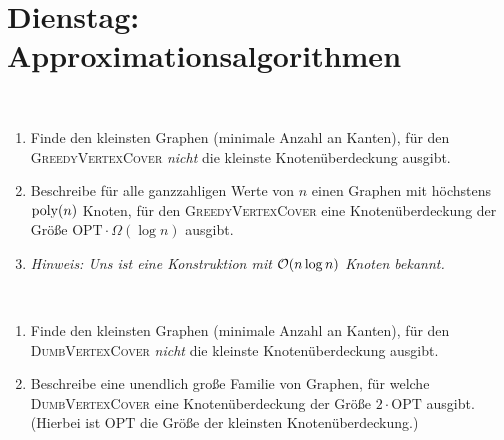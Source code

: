 \documentclass{uebung_cs}
\begin{document}
\section*{Dienstag: Approximationsalgorithmen}

\begin{exercise}\
	\begin{enumerate}
		\item\easy Finde den kleinsten Graphen (minimale Anzahl an Kanten), für den \textsc{GreedyVertexCover} \emph{nicht} die kleinste Knotenüberdeckung ausgibt.
		\item\hard Beschreibe für alle ganzzahligen Werte von $n$ einen Graphen mit höchstens $\operatorname{poly}(n)$ Knoten, für den \textsc{GreedyVertexCover} eine Knotenüberdeckung der Größe $\mathrm{OPT} \cdot \Omega(\log n)$ ausgibt.
		\item[] \textit{Hinweis: Uns ist eine Konstruktion mit $\mathcal{O}(n \log n)$ Knoten bekannt.}
	\end{enumerate}
\end{exercise}

\begin{exercise}[Dummes Vertex-Cover][\href{https://moodle.studiumdigitale.uni-frankfurt.de/moodle/mod/assign/view.php?id=245924}{Moodle}\athome]\
	\begin{enumerate}
		\item\easy Finde den kleinsten Graphen (minimale Anzahl an Kanten), für den \textsc{DumbVertexCover} \emph{nicht} die kleinste Knotenüberdeckung ausgibt.
		\item\medium Beschreibe eine unendlich große Familie von Graphen, für welche \textsc{DumbVertexCover} eine Knotenüberdeckung der Größe $2 \cdot \mathrm{OPT}$ ausgibt.
		      (Hierbei ist $\mathrm{OPT}$ die Größe der kleinsten Knotenüberdeckung.)
	\end{enumerate}
\end{exercise}
\end{document}
